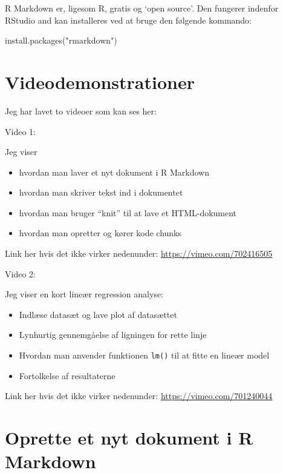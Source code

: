 \documentclass[
]{book}
\newenvironment{Shaded}{\begin{snugshade}}{\end{snugshade}}
\newcommand{\FunctionTok}[1]{\textcolor[rgb]{0.00,0.00,0.00}{#1}}
\newcommand{\NormalTok}[1]{#1}
\newcommand{\StringTok}[1]{\textcolor[rgb]{0.31,0.60,0.02}{#1}}
\providecommand{\tightlist}{%
  \setlength{\itemsep}{0pt}\setlength{\parskip}{0pt}}
\begin{document}
R Markdown er, ligesom R, gratis og `open source'. Den fungerer indenfor RStudio and kan installeres ved at bruge den følgende kommando:

\begin{Shaded}
\begin{Highlighting}[]
\FunctionTok{install.packages}\NormalTok{(}\StringTok{"rmarkdown"}\NormalTok{)}
\end{Highlighting}
\end{Shaded}

\hypertarget{videodemonstrationer}{%
\section{Videodemonstrationer}\label{videodemonstrationer}}

Jeg har lavet to videoer som kan ses her:

Video 1:

Jeg viser

\begin{itemize}
\tightlist
\item
  hvordan man laver et nyt dokument i R Markdown
\item
  hvordan man skriver tekst ind i dokumentet
\item
  hvordan man bruger ``knit'' til at lave et HTML-dokument
\item
  hvordan man opretter og kører kode chunks
\end{itemize}

Link her hvis det ikke virker nedenunder: \url{https://vimeo.com/702416505}

Video 2:

Jeg viser en kort lineær regression analyse:

\begin{itemize}
\tightlist
\item
  Indlæse datasæt og lave plot af datasættet
\item
  Lynhurtig gennemgåelse af ligningen for rette linje
\item
  Hvordan man anvender funktionen \texttt{lm()} til at fitte en lineær model
\item
  Fortolkelse af resultaterne
\end{itemize}

Link her hvis det ikke virker nedenunder: \url{https://vimeo.com/701240044}

\hypertarget{oprette-et-nyt-dokument-i-r-markdown}{%
\section{Oprette et nyt dokument i R Markdown}\label{oprette-et-nyt-dokument-i-r-markdown}}
\end{document}
